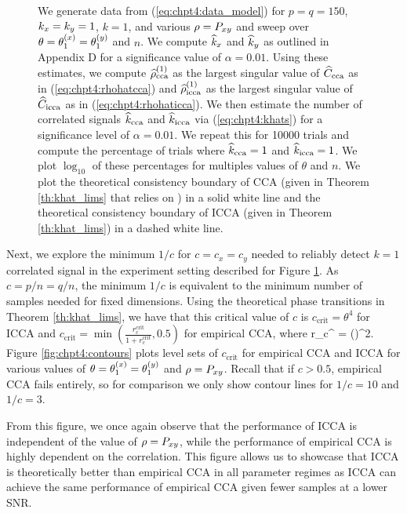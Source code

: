 \begin{figure}
\begin{center}
{    }   
    \caption{We generate data from (\ref{eq:chpt4:data_model}) for $p=q=150$, $k_x=k_y=1$,
      $k=1$, and various $\rho=P_{xy}$ and sweep over $\theta = \theta^{(x)}_1=\theta^{(y)}_1$ and $n$. We
      compute $\widehat{k}_x$ and $\widehat{k}_y$ as outlined in Appendix D for a significance value of
      $\alpha=0.01$. Using these estimates, we compute $\widehat{\rho}_\text{cca}^{(1)}$ as the largest
      singular value of $\widehat{C}_{\text{cca}}$ as in (\ref{eq:chpt4:rhohatcca}) and
      $\widehat{\rho}_\text{icca}^{(1)}$ as the largest singular value of $\widehat{C}_{\text{icca}}$ as in
      (\ref{eq:chpt4:rhohaticca}). We then estimate the number of correlated signals
      $\widehat{k}_{\text{cca}}$ and $\widehat{k}_{\text{icca}}$ via (\ref{eq:chpt4:khats}) for a significance level of
      $\alpha=0.01$. We repeat this for 10000 trials and compute the percentage of trials
      where $\widehat{k}_{\text{cca}}=1$ and $\widehat{k}_{\text{icca}}=1$. We plot $\log_{10}$ of these percentages for
      multiples values of $\theta$ and $n$. We plot the theoretical consistency boundary
      of CCA (given in Theorem \ref{th:khat_lims} that relies on \cite{bao2014canonical})
      in a solid white line and the theoretical consistency boundary of ICCA (given in
      Theorem \ref{th:khat_lims}) in a dashed white line.}
    \label{fig:chpt4:cca_pt}
  \end{center}
\end{figure}

Next, we explore the minimum $1/c$ for $c=c_x=c_y$ needed to reliably detect $k=1$
correlated signal in the experiment setting described for Figure \ref{fig:chpt4:cca_pt}. As $c=p/n=q/n$, the minimum $1/c$ is equivalent to the minimum
number of samples needed for fixed dimensions. Using the theoretical phase transitions in
Theorem \ref{th:khat_lims}, we have that this critical value of $c$ is $c_{\text{crit}} =
\theta^4$ for ICCA and $c_{\text{crit}} =
\min\left(\frac{r_c^{\text{crit}}}{1+r_c^{\text{crit}}}, 0.5\right)$ for empirical CCA, where 
\be
r_c^{} = \left(\right)^2.  
\ee
Figure \ref{fig:chpt4:contours} plots level sets of $c_{\text{crit}}$ for empirical CCA
and ICCA for various values of $\theta=\theta^{(x)}_1=\theta^{(y)}_1$ and $\rho=P_{xy}$. Recall that if
$c>0.5$, empirical CCA fails entirely, so for comparison we only show contour lines for
$1/c=10$ and $1/c=3$.

From this figure, we once again observe that the performance of ICCA is independent of the
value of $\rho=P_{xy}$, while the performance of empirical CCA is highly dependent on the
correlation. This figure allows us to showcase that ICCA is theoretically better than
empirical CCA in all parameter regimes as ICCA can achieve the same performance of
empirical CCA given fewer samples at a lower SNR.

